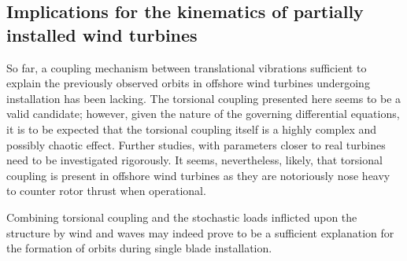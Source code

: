 \documentclass{article}
\begin{document}
\subsection{Implications for the kinematics of partially installed wind turbines}

So far, a coupling mechanism between translational vibrations sufficient to explain the previously observed orbits in offshore wind turbines undergoing installation has been lacking. The torsional coupling presented here seems to be a valid candidate; however, given the nature of the governing differential equations, it is to be expected that the torsional coupling itself is a highly complex and possibly chaotic effect. Further studies, with parameters closer to real turbines need to be investigated rigorously. It seems, nevertheless, likely, that torsional coupling is present in offshore wind turbines as they are notoriously nose heavy to counter rotor thrust when operational. 

Combining torsional coupling and the stochastic loads inflicted upon the structure by wind and waves may indeed prove to be a sufficient explanation for the formation of orbits during single blade installation.

\clearpage


\end{document}
